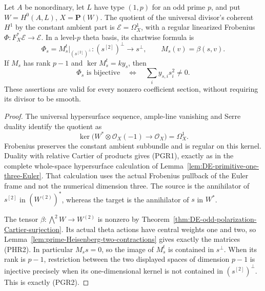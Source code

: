 \begin{lemma}
\label{lem:primitive-prime-Euler-criterion}
Let \(A\) be nonordinary, let \(L\) have type \((1,p)\) for
an odd prime \(p\), and put \(W=H^0(A,L)\),
\(X=\mathbf P(W)\). The quotient of the universal divisor's
coherent \(H^1\) by the constant ambient part is
\(\mathcal E=\Omega_X^1\), with a regular linearized Frobenius
\(\Phi:F_X^*\mathcal E\to\mathcal E\).
In a level-\(p\) theta basis, its chartwise formula is
\[
 \Phi_s=M_s^t\big|_{(s^{[2]})^\perp}:
             (s^{[2]})^\perp\longrightarrow s^\perp,
 \qquad M_s(v)=\beta(s,v).                         \tag{PGR1}
\]
If \(M_s\) has rank \(p-1\) and
\(\ker M_s^t=k y_s\), then
\[
       \Phi_s\text{ is bijective}\quad\Longleftrightarrow\quad
                    \sum_i y_{s,i}s_i^2\ne0.       \tag{PGR2}
\]
These assertions are valid for every nonzero coefficient section,
without requiring its divisor to be smooth.
\end{lemma}
\begin{proof}
The universal hypersurface sequence, ample-line vanishing and
Serre duality identify the quotient as
\[
 \ker\bigl(W^*\otimes\mathcal O_X(-1)
                      \longrightarrow\mathcal O_X\bigr)
                    =\Omega_X^1.                  \tag{PGR3}
\]
Frobenius preserves the constant ambient subbundle and is regular
on this kernel. Duality with relative Cartier of products gives
(PGR1), exactly as in the complete whole-space hypersurface
calculation of Lemma~\ref{lem:DE-primitive-one-three-Euler}.
That calculation uses the actual Frobenius pullback of the Euler
frame and not the numerical dimension three. The source is the
annihilator of \(s^{[2]}\) in \((W^{(2)})^*\), whereas the
target is the annihilator of \(s\) in \(W^*\).

The tensor \(\beta:\bigwedge^2W\to W^{(2)}\) is nonzero
by Theorem~\ref{thm:DE-odd-polarization-Cartier-surjection}.
Its actual theta actions have central weights one and two, so
Lemma~\ref{lem:prime-Heisenberg-two-contractions} gives exactly
the matrices (PHR2). In particular \(M_s s=0\), so the image
of \(M_s^t\) is contained in \(s^\perp\).
When its rank is \(p-1\), restriction between the two displayed
spaces of dimension \(p-1\) is injective precisely when its
one-dimensional kernel is not contained in \((s^{[2]})^\perp\).
This is exactly (PGR2).
\end{proof}

